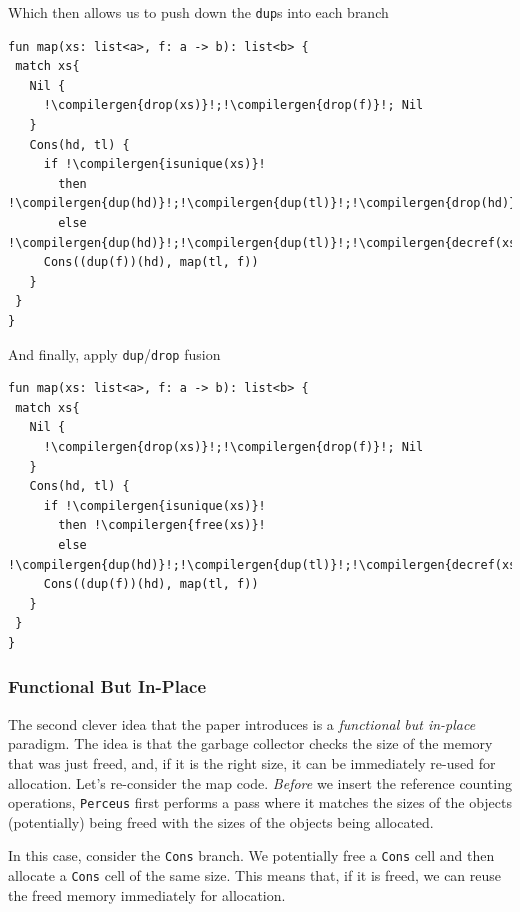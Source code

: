 Which then allows us to push down the \texttt{dup}s into each branch

\begin{code}
\label{code:koka-pushdown-dup}
\begin{verbatim}
fun map(xs: list<a>, f: a -> b): list<b> {
 match xs{
   Nil {
     !\compilergen{drop(xs)}!;!\compilergen{drop(f)}!; Nil
   }
   Cons(hd, tl) {
     if !\compilergen{isunique(xs)}! 
       then !\compilergen{dup(hd)}!;!\compilergen{dup(tl)}!;!\compilergen{drop(hd)}!;!\compilergen{drop(tl)}!;!\compilergen{free(xs)}!
       else !\compilergen{dup(hd)}!;!\compilergen{dup(tl)}!;!\compilergen{decref(xs)}!
     Cons((dup(f))(hd), map(tl, f))
   }
 }
}
\end{verbatim}
\end{code}

And finally, apply \texttt{dup}/\texttt{drop} fusion

\begin{code}
\label{code:koka-pushdown-dup}
\begin{verbatim}
fun map(xs: list<a>, f: a -> b): list<b> {
 match xs{
   Nil {
     !\compilergen{drop(xs)}!;!\compilergen{drop(f)}!; Nil
   }
   Cons(hd, tl) {
     if !\compilergen{isunique(xs)}! 
       then !\compilergen{free(xs)}!
       else !\compilergen{dup(hd)}!;!\compilergen{dup(tl)}!;!\compilergen{decref(xs)}!
     Cons((dup(f))(hd), map(tl, f))
   }
 }
}
\end{verbatim}
\end{code}

\subsubsection{Functional But In-Place}
The second clever idea that the paper introduces is a \textit{functional but in-place} paradigm. The idea is that the garbage collector checks the size of the memory that was just freed, and, if it is the right size, it can be immediately re-used for allocation. Let's re-consider the map code. \textit{Before} we insert the reference counting operations, \texttt{Perceus} first performs a pass where it matches the sizes of the objects (potentially) being freed with the sizes of the objects being allocated. 

In this case, consider the \texttt{Cons} branch. We potentially free a \texttt{Cons} cell and then allocate a \texttt{Cons} cell of the same size. This means that, if it is freed, we can reuse the freed memory immediately for allocation.

